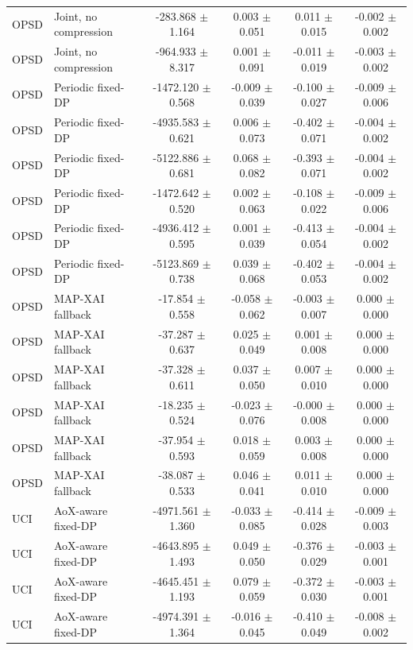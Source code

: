 \begin{tabular}{llcccc}
OPSD & Joint, no compression & -283.868 $\pm$ 1.164 & 0.003 $\pm$ 0.051 & 0.011 $\pm$ 0.015 & -0.002 $\pm$ 0.002 \\
OPSD & Joint, no compression & -964.933 $\pm$ 8.317 & 0.001 $\pm$ 0.091 & -0.011 $\pm$ 0.019 & -0.003 $\pm$ 0.002 \\
OPSD & Periodic fixed-DP & -1472.120 $\pm$ 0.568 & -0.009 $\pm$ 0.039 & -0.100 $\pm$ 0.027 & -0.009 $\pm$ 0.006 \\
OPSD & Periodic fixed-DP & -4935.583 $\pm$ 0.621 & 0.006 $\pm$ 0.073 & -0.402 $\pm$ 0.071 & -0.004 $\pm$ 0.002 \\
OPSD & Periodic fixed-DP & -5122.886 $\pm$ 0.681 & 0.068 $\pm$ 0.082 & -0.393 $\pm$ 0.071 & -0.004 $\pm$ 0.002 \\
OPSD & Periodic fixed-DP & -1472.642 $\pm$ 0.520 & 0.002 $\pm$ 0.063 & -0.108 $\pm$ 0.022 & -0.009 $\pm$ 0.006 \\
OPSD & Periodic fixed-DP & -4936.412 $\pm$ 0.595 & 0.001 $\pm$ 0.039 & -0.413 $\pm$ 0.054 & -0.004 $\pm$ 0.002 \\
OPSD & Periodic fixed-DP & -5123.869 $\pm$ 0.738 & 0.039 $\pm$ 0.068 & -0.402 $\pm$ 0.053 & -0.004 $\pm$ 0.002 \\
OPSD & MAP-XAI fallback & -17.854 $\pm$ 0.558 & -0.058 $\pm$ 0.062 & -0.003 $\pm$ 0.007 & 0.000 $\pm$ 0.000 \\
OPSD & MAP-XAI fallback & -37.287 $\pm$ 0.637 & 0.025 $\pm$ 0.049 & 0.001 $\pm$ 0.008 & 0.000 $\pm$ 0.000 \\
OPSD & MAP-XAI fallback & -37.328 $\pm$ 0.611 & 0.037 $\pm$ 0.050 & 0.007 $\pm$ 0.010 & 0.000 $\pm$ 0.000 \\
OPSD & MAP-XAI fallback & -18.235 $\pm$ 0.524 & -0.023 $\pm$ 0.076 & -0.000 $\pm$ 0.008 & 0.000 $\pm$ 0.000 \\
OPSD & MAP-XAI fallback & -37.954 $\pm$ 0.593 & 0.018 $\pm$ 0.059 & 0.003 $\pm$ 0.008 & 0.000 $\pm$ 0.000 \\
OPSD & MAP-XAI fallback & -38.087 $\pm$ 0.533 & 0.046 $\pm$ 0.041 & 0.011 $\pm$ 0.010 & 0.000 $\pm$ 0.000 \\
UCI & AoX-aware fixed-DP & -4971.561 $\pm$ 1.360 & -0.033 $\pm$ 0.085 & -0.414 $\pm$ 0.028 & -0.009 $\pm$ 0.003 \\
UCI & AoX-aware fixed-DP & -4643.895 $\pm$ 1.493 & 0.049 $\pm$ 0.050 & -0.376 $\pm$ 0.029 & -0.003 $\pm$ 0.001 \\
UCI & AoX-aware fixed-DP & -4645.451 $\pm$ 1.193 & 0.079 $\pm$ 0.059 & -0.372 $\pm$ 0.030 & -0.003 $\pm$ 0.001 \\
UCI & AoX-aware fixed-DP & -4974.391 $\pm$ 1.364 & -0.016 $\pm$ 0.045 & -0.410 $\pm$ 0.049 & -0.008 $\pm$ 0.002 \\

\end{tabular}

